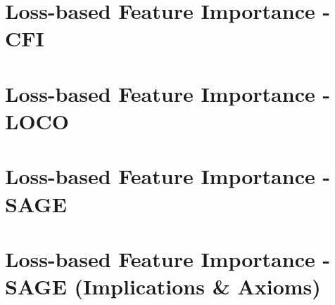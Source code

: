 \documentclass[11pt,compress,t,notes=noshow, aspectratio=169, xcolor=table]{beamer}
\begin{document}


\section{Loss-based Feature Importance - CFI}


\section{Loss-based Feature Importance - LOCO}


\section{Loss-based Feature Importance - SAGE}


\section{Loss-based Feature Importance - SAGE (Implications \& Axioms)}

\end{document}
